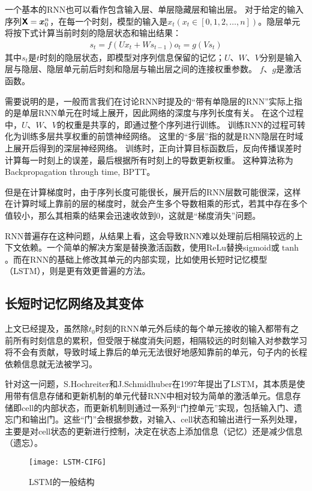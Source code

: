 一个基本的RNN也可以看作包含输入层、单层隐藏层和输出层。
对于给定的输入序列$\boldsymbol{\mathsf{X}}=\boldsymbol{x}^n_0$，在每一个时刻，模型的输入是$x_t(x_t \in [0, 1, 2, \dots, n])$。隐层单元将按下式计算当前时刻的隐层状态和输出结果：
\begin{align}
    s_t = f(Ux_t + Ws_{t-1})
    o_t = g(Vs_t)
\end{align}
其中$s_t$是$t$时刻的隐层状态，即模型对序列信息保留的记忆；$U$、$W$、$V$分别是输入层与隐层、隐层单元前后时刻和隐层与输出层之间的连接权重参数。
$f$、$g$是激活函数。

需要说明的是，一般而言我们在讨论RNN时提及的“带有单隐层的RNN”实际上指的是单层RNN单元在时域上展开，因此网络的深度与序列长度有关。
在这个过程中，$U$、$W$、$V$的权重是共享的，即通过整个序列进行训练。
训练RNN的过程可转化为训练多层共享权重的前馈神经网络。
这里的“多层”指的就是RNN隐层在时域上展开后得到的深层神经网络。
训练时，正向计算目标函数后，反向传播误差时计算每一时刻上的误差，最后根据所有时刻上的导数更新权重。
这种算法称为Backpropagation through time, BPTT。

但是在计算梯度时，由于序列长度可能很长，展开后的RNN层数可能很深，这样在计算时域上靠前的层的梯度时，就会产生多个导数相乘的形式，若其中存在多个值较小，那么其相乘的结果会迅速收敛到0，这就是“梯度消失”问题。

RNN普遍存在这种问题，从结果上看，这会导致RNN难以处理前后相隔较远的上下文依赖。一个简单的解决方案是替换激活函数，使用ReLu替换sigmoid或$\tanh$。而在RNN的基础上修改其单元的内部实现，比如使用长短时记忆模型（LSTM），则是更有效更普遍的方法。

\subsection{长短时记忆网络及其变体}
上文已经提及，虽然除$t_0$时刻的RNN单元外后续的每个单元接收的输入都带有之前所有时刻信息的累积，但受限于梯度消失问题，相隔较远的时刻输入对参数学习将不会有贡献，导致时域上靠后的单元无法很好地感知靠前的单元，句子内的长程依赖信息就无法被学习。

针对这一问题，S.Hochreiter和J.Schmidhuber在1997年提出了LSTM，其本质是使用带有信息存储和更新机制的单元代替RNN中相对较为简单的激活单元。信息存储即cell的内部状态，而更新机制则通过一系列“门控单元”实现，包括输入门、遗忘门和输出门。这些“门”会根据参数，对输入、cell状态和输出进行一系列处理，主要是对cell状态的更新进行控制，决定在状态上添加信息（记忆）还是减少信息（遗忘）。

\begin{figure}[!htpb]
    \centering
    \texttt{[image: LSTM-CIFG]}
    \caption{LSTM的一般结构}
    \label{fig:LSTM}
\end{figure}


